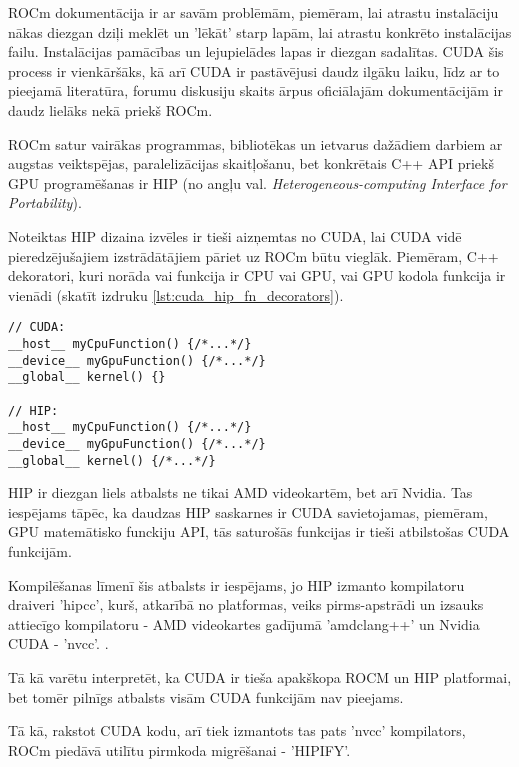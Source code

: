 \documentclass[12pt]{report}%
\theoremstyle{definition}
\begin{document}
ROCm dokumentācija ir ar savām problēmām, piemēram, lai atrastu instalāciju nākas diezgan dziļi meklēt
un 'lēkāt' starp lapām, lai atrastu konkrēto instalācijas failu. Instalācijas pamācības un lejupielādes
lapas ir diezgan sadalītas. CUDA šis process ir vienkāršāks, kā arī CUDA ir pastāvējusi daudz ilgāku
laiku, līdz ar to pieejamā literatūra, forumu diskusiju skaits ārpus oficiālajām dokumentācijām ir daudz 
lielāks nekā priekš ROCm.

ROCm satur vairākas programmas, bibliotēkas un ietvarus dažādiem darbiem ar augstas veiktspējas,
paralelizācijas skaitļošanu, bet konkrētais C++ API priekš GPU programēšanas ir HIP (no angļu val.
\textit{Heterogeneous-computing Interface for Portability}).\cite{HIP_docs}

Noteiktas HIP dizaina izvēles ir tieši aizņemtas no CUDA, lai CUDA vidē pieredzējušajiem
izstrādātājiem pāriet uz ROCm būtu vieglāk. Piemēram, C++ dekoratori, kuri norāda vai funkcija ir CPU
vai GPU, vai GPU kodola funkcija ir vienādi (skatīt  izdruku \ref{lst:cuda_hip_fn_decorators}).

\begin{lstlisting}[caption={CUDA un HIP funkciju definīciju salīdzinājums},
  label=lst:cuda_hip_fn_decorators,
  captionpos=t
]
// CUDA:
__host__ myCpuFunction() {/*...*/}
__device__ myGpuFunction() {/*...*/}
__global__ kernel() {}

// HIP:
__host__ myCpuFunction() {/*...*/}
__device__ myGpuFunction() {/*...*/}
__global__ kernel() {/*...*/}
\end{lstlisting}

HIP ir diezgan liels atbalsts ne tikai AMD videokartēm, bet arī Nvidia. Tas iespējams tāpēc, ka 
daudzas HIP saskarnes ir CUDA savietojamas, piemēram, GPU matemātisko funckiju API, tās saturošās funkcijas
ir tieši atbilstošas CUDA funkcijām.\cite{HIP_math_API,CUDA_math_API}

Kompilēšanas līmenī šis atbalsts ir iespējams, jo HIP izmanto kompilatoru draiveri 'hipcc', kurš,
atkarībā no platformas, veiks pirms-apstrādi un izsauks attiecīgo kompilatoru -
AMD videokartes gadījumā 'amdclang++' un Nvidia CUDA - 'nvcc'. \cite{HIP_compilers}.

Tā kā varētu interpretēt, ka CUDA ir tieša apakškopa ROCM un HIP platformai, bet tomēr pilnīgs atbalsts
visām CUDA funkcijām nav pieejams.



Tā kā, rakstot CUDA kodu, arī tiek izmantots tas pats 'nvcc' kompilators, ROCm piedāvā utilītu
pirmkoda migrēšanai - 'HIPIFY'. \cite{HIPIFY_github}
\end{document}
